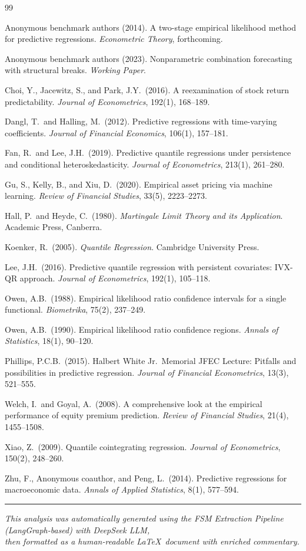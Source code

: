 \documentclass[11pt,a4paper]{article}
\theoremstyle{definition}
\theoremstyle{remark}
\begin{document}
\begin{thebibliography}{99}

Anonymous benchmark authors (2014).
A two-stage empirical likelihood method for predictive regressions.
\textit{Econometric Theory}, forthcoming.

Anonymous benchmark authors (2023).
Nonparametric combination forecasting with structural breaks.
\textit{Working Paper}.

Choi, Y., Jacewitz, S., and Park, J.Y.\ (2016).
A reexamination of stock return predictability.
\textit{Journal of Econometrics}, 192(1), 168--189.

Dangl, T.\ and Halling, M.\ (2012).
Predictive regressions with time-varying coefficients.
\textit{Journal of Financial Economics}, 106(1), 157--181.

Fan, R.\ and Lee, J.H.\ (2019).
Predictive quantile regressions under persistence and conditional heteroskedasticity.
\textit{Journal of Econometrics}, 213(1), 261--280.

Gu, S., Kelly, B., and Xiu, D.\ (2020).
Empirical asset pricing via machine learning.
\textit{Review of Financial Studies}, 33(5), 2223--2273.

Hall, P.\ and Heyde, C.\ (1980).
\textit{Martingale Limit Theory and its Application}.
Academic Press, Canberra.

Koenker, R.\ (2005).
\textit{Quantile Regression}.
Cambridge University Press.

Lee, J.H.\ (2016).
Predictive quantile regression with persistent covariates: IVX-QR approach.
\textit{Journal of Econometrics}, 192(1), 105--118.

Owen, A.B.\ (1988).
Empirical likelihood ratio confidence intervals for a single functional.
\textit{Biometrika}, 75(2), 237--249.

Owen, A.B.\ (1990).
Empirical likelihood ratio confidence regions.
\textit{Annals of Statistics}, 18(1), 90--120.

Phillips, P.C.B.\ (2015).
Halbert White Jr.\ Memorial JFEC Lecture: Pitfalls and possibilities
in predictive regression.
\textit{Journal of Financial Econometrics}, 13(3), 521--555.

Welch, I.\ and Goyal, A.\ (2008).
A comprehensive look at the empirical performance of equity premium prediction.
\textit{Review of Financial Studies}, 21(4), 1455--1508.

Xiao, Z.\ (2009).
Quantile cointegrating regression.
\textit{Journal of Econometrics}, 150(2), 248--260.

Zhu, F., Anonymous coauthor, and Peng, L.\ (2014).
Predictive regressions for macroeconomic data.
\textit{Annals of Applied Statistics}, 8(1), 577--594.

\end{thebibliography}

\medskip
\noindent\rule{\textwidth}{0.4pt}
\begin{center}
\small\textit{This analysis was automatically generated using the FSM Extraction Pipeline
(LangGraph-based) with DeepSeek LLM,}\\
\small\textit{then formatted as a human-readable \LaTeX\ document with enriched commentary.}
\end{center}
\end{document}
